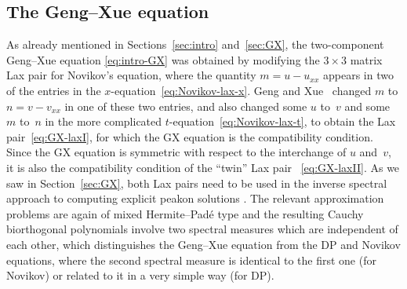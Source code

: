 \documentclass[10pt,a4paper]{article} \pdfoutput=1 
\begin{document}
\subsection{The Geng--Xue equation}
\label{sec:guide-GX}

As already mentioned in Sections~\ref{sec:intro} and~\ref{sec:GX},
the two-component Geng--Xue equation \eqref{eq:intro-GX} was
obtained by modifying the $3 \times 3$ matrix Lax pair for Novikov's equation,
where the quantity $m = u - u_{xx}$ appears in two of the entries in the $x$-equation~\eqref{eq:Novikov-lax-x}.
Geng and Xue~\cite{geng-xue:2009:GX-peakon-equation-cubic-nonlinearity}
changed $m$ to $n = v - v_{xx}$ in one of these two entries, and also
changed some $u$ to~$v$ and some $m$ to~$n$ in the more complicated $t$-equation~\eqref{eq:Novikov-lax-t},
to obtain the Lax pair~\eqref{eq:GX-laxI}, for which the GX equation is the compatibility condition.
Since the GX equation is symmetric with respect to the interchange of $u$ and~$v$,
it is also the compatibility condition of the ``twin'' Lax pair ~\eqref{eq:GX-laxII}.
As we saw in Section~\ref{sec:GX}, both Lax pairs need to be used in the inverse
spectral approach to computing explicit peakon solutions
\cite{lundmark-szmigielski:2016:GX-inverse-problem,
  lundmark-szmigielski:2017:GX-dynamics-interlacing,
  shuaib-lundmark:2019:GX-noninterlacing}.
The relevant approximation problems are again of mixed Hermite--Padé type and the resulting
Cauchy biorthogonal polynomials involve two spectral measures which are independent of each other,
which distinguishes the Geng--Xue equation from the DP and Novikov equations,
where the second spectral measure is identical to the first one (for Novikov)
or related to it in a very simple way (for DP).
\end{document}
